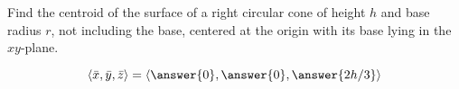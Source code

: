 \documentclass{ximera}
\author{David Guichard \and Neal Koblitz \and H. Jerome Keisler \and Albert Scheller \and Barry Balof \and Mike Wills \and Matthew Carr}
\begin{document}
\begin{exercise}




Find the centroid of the surface of a right circular cone of height $h$ and base radius $r$, not including the base, centered at the origin with its base lying in the $xy$-plane. 

\begin{prompt}
\[
\vector{\bar{x},\bar{y},\bar{z}}=\vector{\answer{0},\answer{0},\answer{2h/3}}
\]
\end{prompt}


\end{exercise}
\end{document}
